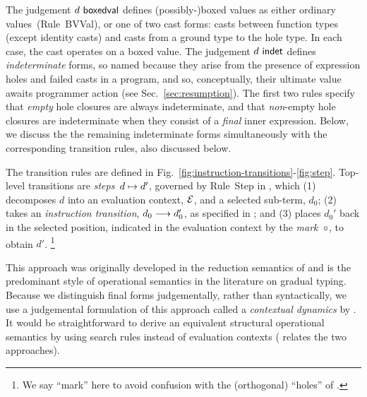 


The judgement $d~\mathsf{boxedval}$ defines (possibly-)boxed values as
either ordinary values~(Rule~{BVVal}), or one of two cast forms: casts
between function types (except identity casts) and casts from a ground
type to the hole type. In each case, the cast operates on a boxed
value.
%
%
The judgement $d~\mathsf{indet}$ defines \emph{indeterminate} forms, so
named because they arise from the presence of expression holes and
failed casts in a program, and so, conceptually, their ultimate value
awaits programmer action (see Sec.~\ref{sec:resumption}).
%
The first two rules specify that \emph{empty} hole closures are always
indeterminate, and that \emph{non}-empty hole closures are indeterminate when
they consist of a \emph{final} inner expression.
%
Below, we discuss the the remaining indeterminate forms simultaneously
with the corresponding transition rules, also discussed
below.



The transition rules are defined in Fig.~\ref{fig:instruction-transitions}-\ref{fig:step}.
%
Top-level transitions are \emph{steps}~$d \mapsto d'$, governed by Rule~{Step} in , which
%
(1) decomposes $d$ into an evaluation context, $\mathcal{E}$, and a selected sub-term, $d_0$;
%
(2) takes an \emph{instruction transition}, $d_0 \longrightarrow d_0'$, as specified in ;
%
and (3) places $d_0'$ back in the selected position, indicated in
the evaluation context by the \emph{mark}~$\circ$, to obtain $d'$.%
\footnote{
        We say ``mark'' here to avoid confusion with the (orthogonal) ``holes'' of \HazelnutLive.
        }
%

%
This approach was originally developed in the reduction semantics of \citet{DBLP:journals/tcs/FelleisenH92} and is the predominant style of operational semantics in the literature on gradual typing. 
Because we distinguish final forms judgementally, rather than syntactically, we use a judgemental formulation of this approach called a \emph{contextual dynamics} by \citet{pfpl}. 
It would be straightforward to derive an equivalent structural operational semantics \cite{DBLP:journals/jlp/Plotkin04a} by using search rules instead of evaluation contexts (\citet{pfpl} relates the two approaches).

